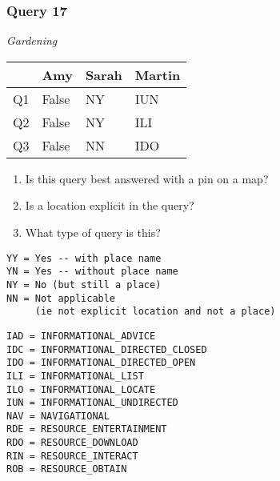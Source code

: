 \begin{frame}[fragile]
\frametitle{Query 17}
\vspace{1em}

\emph{Gardening}

\vfill

\begin{table}
  \centering
  \begin{tabular}{ l l l l }
    & \textbf{Amy} & \textbf{Sarah} & \textbf{Martin}\\
    \toprule
    Q1 & False & NY & IUN\\
Q2 & False & NY & ILI\\
Q3 & False & NN & IDO\\
    \bottomrule
  \end{tabular}
\end{table}

\vfill

\tiny{

\begin{enumerate}
\item Is this query best answered with a pin on a map?
\item Is a location explicit in the query?
\item What type of query is this?
\end{enumerate}

\vfill

\begin{multicols}{2}
\begin{verbatim}
YY = Yes -- with place name
YN = Yes -- without place name
NY = No (but still a place)
NN = Not applicable 
     (ie not explicit location and not a place)
\end{verbatim}

\columnbreak
\begin{verbatim}
IAD = INFORMATIONAL_ADVICE
IDC = INFORMATIONAL_DIRECTED_CLOSED
IDO = INFORMATIONAL_DIRECTED_OPEN
ILI = INFORMATIONAL_LIST
ILO = INFORMATIONAL_LOCATE
IUN = INFORMATIONAL_UNDIRECTED
NAV = NAVIGATIONAL
RDE = RESOURCE_ENTERTAINMENT
RDO = RESOURCE_DOWNLOAD
RIN = RESOURCE_INTERACT
ROB = RESOURCE_OBTAIN
\end{verbatim}
\end{multicols}
}

\end{frame}


